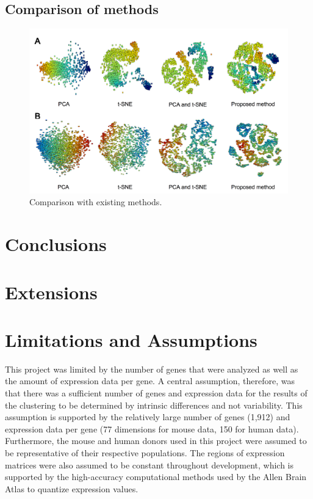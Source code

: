 \documentclass[12pt,oneside,onecolumn,a4paper]{article}
\begin{document}
\subsection{Comparison of methods}

\begin{figure}[H]
\begin{center}
\includegraphics[width=\columnwidth]{figures/dimreduce_comparisons}
\caption{Comparison with existing methods. \label{fig:image_scatter}%
}
\end{center}
\end{figure}

\section{Conclusions}

\section{Extensions}




\appendix

\section{Limitations and Assumptions}

This project was limited by the number of genes that were analyzed as well as the amount of expression data per gene. A central assumption, therefore, was that there was a sufficient number of genes and expression data for the results of the clustering to be determined by intrinsic differences and not variability. This assumption is supported by the relatively large number of genes (1,912) and expression data per gene (77 dimensions for mouse data, 150 for human data). Furthermore, the mouse and human donors used in this project were assumed to be representative of their respective populations. The regions of expression matrices were also assumed to be constant throughout development, which is supported by the high-accuracy computational methods used by the Allen Brain Atlas to quantize expression values.
\end{document}
